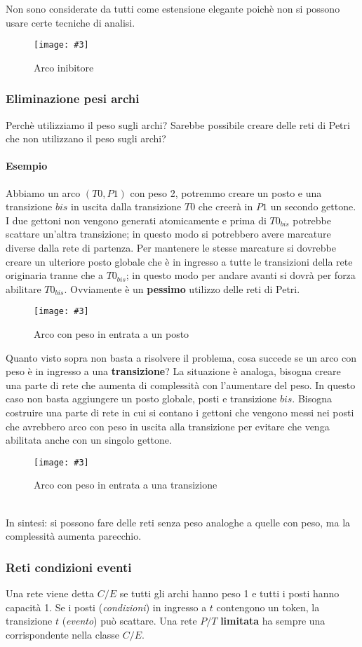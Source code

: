 \documentclass[12pt, twoside, letterpaper]{article}
\newcommand{\img}[3] {
	\begin{figure}[h]
		\caption{#1}
		\centering
		\texttt{[image: \#3]}\\
	\end{figure}
}
\begin{document}
				Non sono considerate da tutti come estensione elegante poichè non si possono usare certe tecniche di analisi.
				\img{Arco inibitore}{0.4}{img/archi_inibitori.png}
				
			\subsubsection{Eliminazione pesi archi}
				Perchè utilizziamo il peso sugli archi? Sarebbe possibile creare delle reti di Petri che non utilizzano il peso sugli archi? 
				
				\paragraph{Esempio} Abbiamo un arco $(T0,P1)$ con peso 2, potremmo creare un posto e una transizione $bis$ in uscita dalla transizione $T0$ che creerà in $P1$ un secondo gettone. I due gettoni non vengono generati atomicamente e prima di $T0_{bis}$ potrebbe scattare un'altra transizione; in questo modo si potrebbero avere marcature diverse dalla rete di partenza. Per mantenere le stesse marcature si dovrebbe creare un ulteriore posto globale che è in ingresso a tutte le transizioni della rete originaria tranne che a $T0_{bis}$; in questo modo per andare avanti si dovrà per forza abilitare $T0_{bis}$. Ovviamente è un \textbf{pessimo} utilizzo delle reti di Petri.
				\img{Arco con peso in entrata a un posto}{0.4}{img/p_globale.png}
				
				Quanto visto sopra non basta a risolvere il problema, cosa succede se un arco con peso è in ingresso a una \textbf{transizione}? La situazione è analoga, bisogna creare una parte di rete che aumenta di complessità con l'aumentare del peso. In questo caso non basta aggiungere un posto globale, posti e transizione $bis$. Bisogna costruire una parte di rete in cui si contano i gettoni che vengono messi nei posti che avrebbero arco con peso in uscita alla transizione per evitare che venga abilitata anche con un singolo gettone.
				\img{Arco con peso in entrata a una transizione}{0.4}{img/p_globale2.png}
				\\In sintesi: si possono fare delle reti senza peso analoghe a quelle con peso, ma la complessità aumenta parecchio. 
				
			\subsubsection{Reti condizioni eventi}
				Una rete viene detta $C/E$ se tutti gli archi hanno peso 1 e tutti i posti hanno capacità 1. Se i posti (\textit{condizioni}) in ingresso a $t$ contengono un token, la transizione $t$ (\textit{evento}) può scattare. Una rete $P/T$ \textbf{limitata} ha sempre una corrispondente nella classe $C/E$. 
				
\end{document}
